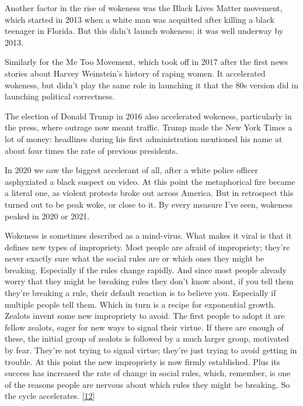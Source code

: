 Another
                  factor in the rise of wokeness was the Black Lives Matter
                  movement, which started in 2013 when a white man was acquitted
                  after killing a black teenager in Florida. But this didn't
                  launch wokeness; it was well underway by 2013.

Similarly
                  for the Me Too Movement, which took off in 2017 after the
                  first news stories about Harvey Weinstein's history of raping
                  women. It accelerated wokeness, but didn't play the same role
                  in launching it that the 80s version did in launching
                  political correctness.

The election of Donald Trump
                  in 2016 also accelerated wokeness, particularly in the press,
                  where outrage now meant traffic. Trump made the New York Times
                  a lot of money: headlines during his first administration
                  mentioned his name at about four times the rate of previous
                  presidents.

In 2020 we saw the biggest accelerant
                  of all, after a white police officer asphyxiated a black
                  suspect on video. At this point the metaphorical fire became a
                  literal one, as violent protests broke out across America. But
                  in retrospect this turned out to be peak woke, or close to it.
                  By every measure I've seen, wokeness peaked in 2020 or
                  2021.

Wokeness is sometimes described as a
                  mind-virus. What makes it viral is that it defines new types
                  of impropriety. Most people are afraid of impropriety; they're
                  never exactly sure what the social rules are or which ones
                  they might be breaking. Especially if the rules change
                  rapidly. And since most people already worry that they might
                  be breaking rules they don't know about, if you tell them
                  they're breaking a rule, their default reaction is to believe
                  you. Especially if multiple people tell them. Which in turn is
                  a recipe for exponential growth. Zealots invent some new
                  impropriety to avoid. The first people to adopt it are fellow
                  zealots, eager for new ways to signal their virtue. If there
                  are enough of these, the initial group of zealots is followed
                  by a much larger group, motivated by fear. They're not trying
                  to signal virtue; they're just trying to avoid getting in
                  trouble. At this point the new impropriety is now firmly
                  established. Plus its success has increased the rate of change
                  in social rules, which, remember, is one of the reasons people
                  are nervous about which rules they might be breaking. So the
                  cycle accelerates.
                  [\href{\#f12n}{12}]

